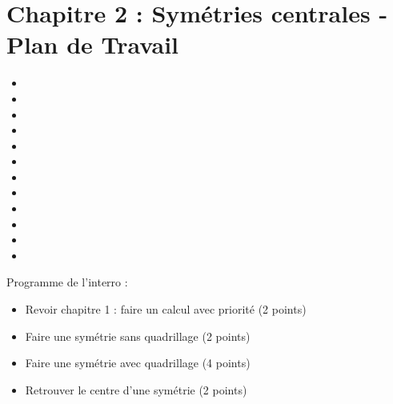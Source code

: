 \section*{Chapitre 2 : Symétries centrales - Plan de Travail}

{\begin{multicols}{4}
\begin{itemize}
    \itemindent=-25pt
        \item {}
        \item {}
        \item {}
        \item {}
        \item {}
        \item {}
        \item {}
        \item {}
        \item {}
        \item {}
        \item {}
        \item {}
    \end{itemize}
\end{multicols}}

\begin{plandetravailDS}
    Programme de l'interro :
    \begin{itemize}
        \item Revoir chapitre 1 : faire un calcul avec priorité (2 points) 
        \item Faire une symétrie sans quadrillage (2 points)
        \item Faire une symétrie avec quadrillage (4 points)
        \item Retrouver le centre d'une symétrie (2 points)
    \end{itemize}
\end{plandetravailDS}

